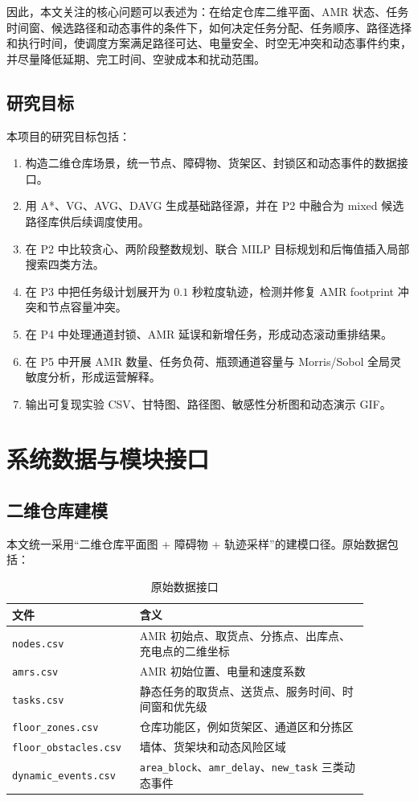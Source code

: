 \documentclass[12pt,a4paper,UTF8]{ctexart}
\begin{document}
因此，本文关注的核心问题可以表述为：在给定仓库二维平面、AMR 状态、任务时间窗、候选路径和动态事件的条件下，如何决定任务分配、任务顺序、路径选择和执行时间，使调度方案满足路径可达、电量安全、时空无冲突和动态事件约束，并尽量降低延期、完工时间、空驶成本和扰动范围。

\subsection{研究目标}

本项目的研究目标包括：

\begin{enumerate}
  \item 构造二维仓库场景，统一节点、障碍物、货架区、封锁区和动态事件的数据接口。
  \item 用 A*、VG、AVG、DAVG 生成基础路径源，并在 P2 中融合为 mixed 候选路径库供后续调度使用。
  \item 在 P2 中比较贪心、两阶段整数规划、联合 MILP 目标规划和后悔值插入局部搜索四类方法。
  \item 在 P3 中把任务级计划展开为 $0.1$ 秒粒度轨迹，检测并修复 AMR footprint 冲突和节点容量冲突。
  \item 在 P4 中处理通道封锁、AMR 延误和新增任务，形成动态滚动重排结果。
  \item 在 P5 中开展 AMR 数量、任务负荷、瓶颈通道容量与 Morris/Sobol 全局灵敏度分析，形成运营解释。
  \item 输出可复现实验 CSV、甘特图、路径图、敏感性分析图和动态演示 GIF。
\end{enumerate}

\section{系统数据与模块接口}

\subsection{二维仓库建模}

本文统一采用“二维仓库平面图 + 障碍物 + 轨迹采样”的建模口径。原始数据包括：

\begin{table}[H]
\centering
\small
\begin{tabular}{p{0.28\linewidth}p{0.60\linewidth}}
\toprule
文件 & 含义 \\
\midrule
\verb|nodes.csv| & AMR 初始点、取货点、分拣点、出库点、充电点的二维坐标 \\
\verb|amrs.csv| & AMR 初始位置、电量和速度系数 \\
\verb|tasks.csv| & 静态任务的取货点、送货点、服务时间、时间窗和优先级 \\
\verb|floor_zones.csv| & 仓库功能区，例如货架区、通道区和分拣区 \\
\verb|floor_obstacles.csv| & 墙体、货架块和动态风险区域 \\
\verb|dynamic_events.csv| & \verb|area_block|、\verb|amr_delay|、\verb|new_task| 三类动态事件 \\
\bottomrule
\end{tabular}
\caption{原始数据接口}
\label{tab:raw-data}
\end{table}
\end{document}
